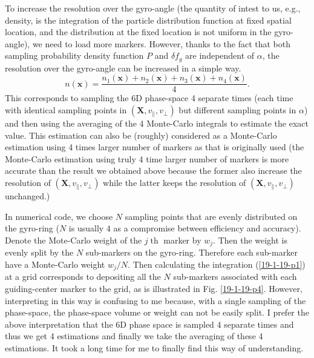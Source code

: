 \documentclass{article}
\newcommand{\tmop}[1]{\ensuremath{\operatorname{#1}}}
\begin{document}
To increase the resolution over the gyro-angle (the quantity of intest to us,
e.g., density, is the integration of the particle distribution function at
fixed spatial location, and the distribution at the fixed location is not
uniform in the gyro-angle), we need to load more markers. However, thanks to
the fact that both sampling probability density function $P$ and $\delta f_g$
are independent of $\alpha$, the resolution over the gyro-angle can be
increased in a simple way.
\begin{equation}
  n (\mathbf{x}) = \frac{n_1 (\mathbf{x}) + n_2 (\mathbf{x}) + n_3
  (\mathbf{x}) + n_4 (\mathbf{x})}{4} .
\end{equation}
This corresponds to sampling the 6D phase-space 4 separate times (each time
with identical sampling points in $(\mathbf{X}, v_{\parallel}, v_{\perp})$ but
different sampling points in $\alpha$) and then using the averaging of the 4
Monte-Carlo integrals to estimate the exact value. This estimation can also be
(roughly) considered as a Monte-Carlo estimation using 4 times larger number
of markers as that is originally used (the Monte-Carlo estimation using truly
4 time larger number of markers is more accurate than the result we obtained
above because the former also increase the resolution of $(\mathbf{X},
v_{\parallel}, v_{\perp})$ while the latter keeps the resolution of
$(\mathbf{X}, v_{\parallel}, v_{\perp})$ unchanged.)

In numerical code, we choose $N$ sampling points that are evenly distributed
on the gyro-ring ($N$ is usually $4$ as a compromise between efficiency and
accuracy). Denote the Mote-Carlo weight of the $j \tmop{th}$ marker by $w_j$.
Then the weight is evenly split by the $N$ sub-markers on the gyro-ring.
Therefore each sub-marker have a Monte-Carlo weight $w_j / N$. Then
calculating the integration (\ref{19-1-19-p1}) at a grid corresponds to
depositing all the $N$ sub-markers associated with each guiding-center marker
to the grid, as is illustrated in Fig. \ref{19-1-19-p4}. However, interpreting
in this way is confusing to me because, with a single sampling of the
phase-space, the phase-space volume or weight can not be easily split. I
prefer the above interpretation that the 6D phase space is sampled 4 separate
times and thus we get 4 estimations and finally we take the averaging of these
4 estimations. It took a long time for me to finally find this way of
understanding.
\end{document}
